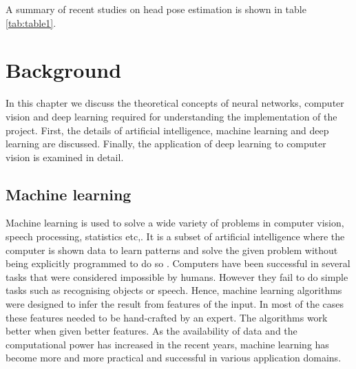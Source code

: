 \documentclass[a4paper, 12pt, oneside, BCOR1cm,toc=chapterentrywithdots]{scrbook}
\begin{document}
A summary of recent studies on head pose estimation is shown in table \ref{tab:table1}. 


\chapter{Background}
 In this chapter we discuss the theoretical concepts of neural networks, computer vision and deep learning required for understanding the implementation of the project. First, the details of artificial intelligence, machine learning and deep learning are discussed. Finally, the application of deep learning to computer vision is examined in detail. 
 
 \section{Machine learning}
 
Machine learning is used to solve a wide variety of problems in computer vision, speech processing, statistics etc,. It is a subset of artificial intelligence where the computer is shown data to learn patterns and solve the given problem without being explicitly programmed to do so \cite{awad_machine_2015}. Computers have been successful in several tasks that were considered impossible by humans. However they fail to do simple tasks such as recognising objects or speech. Hence, machine learning algorithms were designed to infer the result from features of the input. In most of the cases these features needed to be hand-crafted by an expert. The algorithms work better when given better features. As the availability of data and the computational power has increased in the recent years, machine learning has become more and more practical and successful in various application domains.
\end{document}
